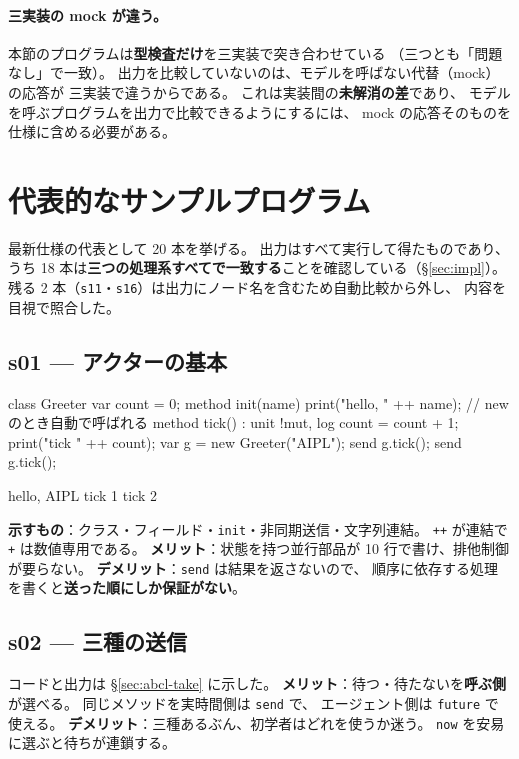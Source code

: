 \documentclass[11pt,a4paper]{ltjsarticle}
\theoremstyle{definition}
\theoremstyle{remark}
\begin{document}
\paragraph{三実装の mock が違う。}
本節のプログラムは\textbf{型検査だけ}を三実装で突き合わせている
（三つとも「問題なし」で一致）。
出力を比較していないのは、モデルを呼ばない代替（mock）の応答が
三実装で違うからである。
これは実装間の\textbf{未解消の差}であり、
モデルを呼ぶプログラムを出力で比較できるようにするには、
mock の応答そのものを仕様に含める必要がある。

\section{代表的なサンプルプログラム}
\label{sec:samples}

最新仕様の代表として 20 本を挙げる。
出力はすべて実行して得たものであり、
うち 18 本は\textbf{三つの処理系すべてで一致する}ことを確認している（\S\ref{sec:impl}）。
残る 2 本（\texttt{s11}・\texttt{s16}）は出力にノード名を含むため自動比較から外し、
内容を目視で照合した。

\subsection{s01 --- アクターの基本}
\begin{aipl}
class Greeter {
  var count = 0;
  method init(name) { print("hello, " ++ name); }   // new のとき自動で呼ばれる
  method tick() : unit !{mut, log} {
    count = count + 1;
    print("tick " ++ count);
  }
}
var g = new Greeter("AIPL");
send g.tick();
send g.tick();
\end{aipl}
\begin{term}
hello, AIPL
tick 1
tick 2
\end{term}
\textbf{示すもの}：クラス・フィールド・\texttt{init}・非同期送信・文字列連結。
\texttt{++} が連結で \texttt{+} は数値専用である。
\textbf{メリット}：状態を持つ並行部品が 10 行で書け、排他制御が要らない。
\textbf{デメリット}：\texttt{send} は結果を返さないので、
順序に依存する処理を書くと\textbf{送った順にしか保証がない}。

\subsection{s02 --- 三種の送信}
コードと出力は \S\ref{sec:abcl-take} に示した。
\textbf{メリット}：待つ・待たないを\textbf{呼ぶ側}が選べる。
同じメソッドを実時間側は \texttt{send} で、
エージェント側は \texttt{future} で使える。
\textbf{デメリット}：三種あるぶん、初学者はどれを使うか迷う。
\texttt{now} を安易に選ぶと待ちが連鎖する。
\end{document}
